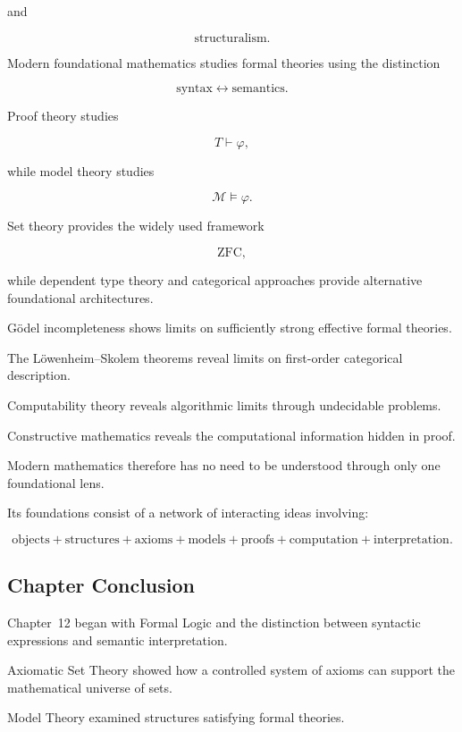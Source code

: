 and

\[
\boxed{
\text{structuralism}.
}
\]

Modern foundational mathematics studies formal theories using the
distinction

\[
\boxed{
\text{syntax}
\leftrightarrow
\text{semantics}.
}
\]

Proof theory studies

\[
\boxed{
T\vdash\varphi,
}
\]

while model theory studies

\[
\boxed{
\mathcal{M}\models\varphi.
}
\]

Set theory provides the widely used framework

\[
\boxed{
\mathrm{ZFC},
}
\]

while dependent type theory and categorical approaches provide alternative
foundational architectures.

Gödel incompleteness shows limits on sufficiently strong effective formal
theories.

The Löwenheim--Skolem theorems reveal limits on first-order categorical
description.

Computability theory reveals algorithmic limits through undecidable
problems.

Constructive mathematics reveals the computational information hidden in
proof.

Modern mathematics therefore has no need to be understood through only one
foundational lens.

Its foundations consist of a network of interacting ideas involving:

\[
\boxed{
\text{objects}
+
\text{structures}
+
\text{axioms}
+
\text{models}
+
\text{proofs}
+
\text{computation}
+
\text{interpretation}.
}
\]

\subsection{Chapter Conclusion}
\label{subsec:logic-foundations-chapter-conclusion}

Chapter~12 began with Formal Logic and the distinction between syntactic
expressions and semantic interpretation.

Axiomatic Set Theory showed how a controlled system of axioms can support
the mathematical universe of sets.

Model Theory examined structures satisfying formal theories.

